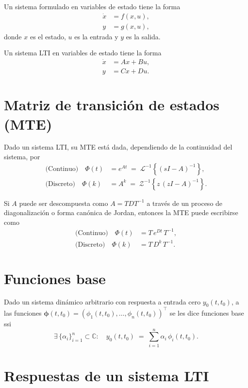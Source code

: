 \documentclass[
  11pt,
  letterpaper,
   addpoints,
  answers
  ]{exam}
\begin{document}
Un sistema formulado en variables de estado tiene la forma
\begin{align}
  \dot{x} &= f(x,u),\\
  y &= g(x,u),
\end{align}
donde $x$ es el estado, $u$ es la entrada y $y$ es la salida.

Un sistema LTI en variables de estado tiene la forma
\begin{align}
  \dot{x} &= A x + B u, \\
  y &= C x + D u.
\end{align}

\section*{Matriz de transición de estados (MTE)}

Dado un sistema LTI, su MTE está dada, dependiendo de la continuidad del sistema, por
\begin{align}
  \text{(Continuo)}\quad \Phi(t) &= e^{At} \;=\; \mathcal{L}^{-1}\!\left\{(sI-A)^{-1}\right\},\\
  \text{(Discreto)}\quad \Phi(k) &= A^{k} \;=\; \mathcal{Z}^{-1}\!\left\{z\,(zI-A)^{-1}\right\}.
\end{align}

Si $A$ puede ser descompuesta como $A=TDT^{-1}$ a través de un proceso de diagonalización o forma canónica de Jordan, entonces la MTE puede escribirse como
\begin{align}
  \text{(Continuo)}\quad \Phi(t) &= T\,e^{Dt}\,T^{-1},\\
  \text{(Discreto)}\quad \Phi(k) &= T\,D^{k}\,T^{-1}.
\end{align}

\section*{Funciones base}

Dado un sistema dinámico arbitrario con respuesta a entrada cero $y_0(t,t_0)$, a las funciones $\bm{\phi}(t,t_0)=(\phi_1(t,t_0),\dots,\phi_n(t,t_0))^\top$ se les dice funciones base ssi
\begin{equation}
  \exists\, \{\alpha_i\}_{i=1}^{n}\subset\mathbb{C}:\quad y_0(t,t_0)\;=\;\sum_{i=1}^{n} \alpha_i\,\phi_i(t,t_0).
\end{equation}

\section*{Respuestas de un sistema LTI}
\end{document}
